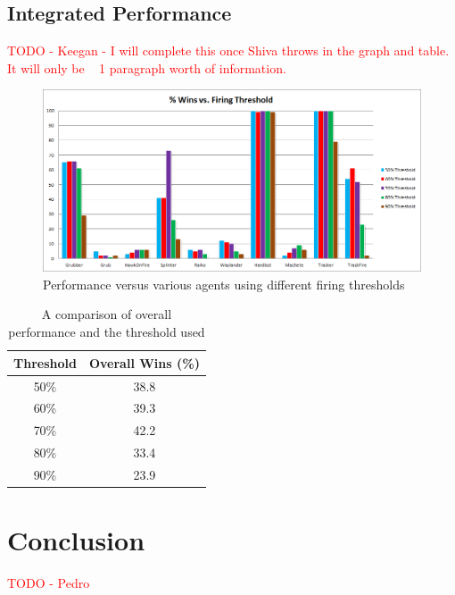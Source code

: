 \documentclass{article}
\newcommand{\xxx}[1]{\textcolor{red}{#1}}
\theoremstyle{plain}
\theoremstyle{definition}
\theoremstyle{remark}
\begin{document}
\subsection*{Integrated Performance}
\xxx{TODO - Keegan - I will complete this once Shiva throws in the graph and table. It will only be ~ 1 paragraph worth of information.}

\begin{figure}[h]
\centering
		\includegraphics[width=15 cm]{svm_results.png}
	\caption{Performance versus various agents using different firing thresholds}
	\label{svm_res}
\end{figure}

\begin{table}[h]
\centering
    \begin{tabular}{|c|c|}
        \hline
        \bf{Threshold} & \bf{Overall Wins (\%) }\\ \hline
        50\%      & 38.8   \\ \hline
        60\%      & 39.3   \\ \hline
        70\%      & 42.2   \\ \hline
        80\%      & 33.4   \\ \hline
        90\%      & 23.9   \\
        \hline
    \end{tabular}
\label{svm_thresh}
\caption{A comparison of overall performance and the threshold used}
\end{table}

\section{Conclusion}
\xxx{TODO - Pedro}
\end{document}
